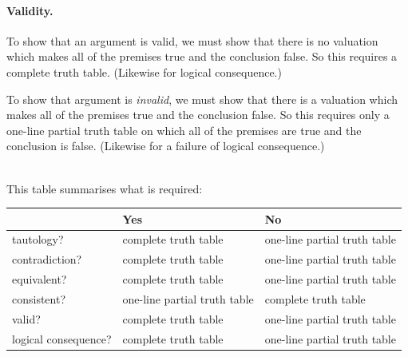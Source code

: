 \paragraph{Validity.}
To show that an argument is valid, we must show that there is no valuation which makes all of the premises true and the conclusion false. So this  requires a complete truth table.  (Likewise for logical consequence.)

To show that argument is \emph{invalid}, we must show that there is a valuation which makes all of the premises true and the conclusion false. So this requires only a one-line partial truth table on which all of the premises are true and the conclusion is false. (Likewise for a failure of logical consequence.)


\
\\This table summarises what is required:

\begin{center}
	\begin{tabular}{l l l}
		& \textbf{Yes} & \textbf{No}\\
		\hline
		tautology? & complete truth table & one-line partial truth table\\
		contradiction? &  complete truth table  & one-line partial truth table\\
		equivalent? & complete truth table & one-line partial truth table\\
		consistent? & one-line partial truth table & complete truth table\\
		valid? & complete truth table & one-line partial truth table\\
		logical consequence? & complete truth table & one-line partial truth table\\
	\end{tabular}
\end{center}
\label{table:CompleteVsPartial}

